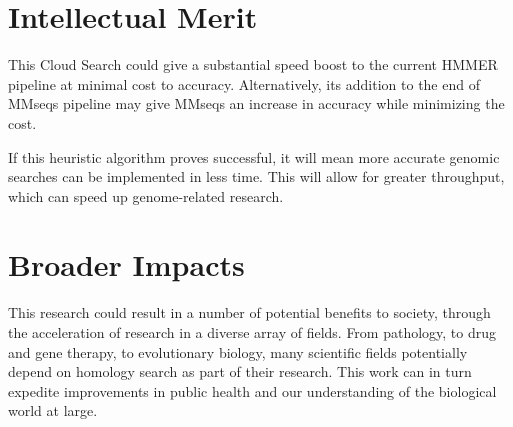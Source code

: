 \documentclass{article}
\begin{document}
	\section{Intellectual Merit}
	
	This Cloud Search could give a substantial speed boost to the current HMMER pipeline at minimal cost to accuracy.  Alternatively, its addition to the end of MMseqs pipeline may give MMseqs an increase in accuracy while minimizing the cost.  
	
	If this heuristic algorithm proves successful, it will mean more accurate genomic searches can be implemented in less time.  This will allow for greater throughput, which can speed up genome-related research.  
	
	\section{Broader Impacts}
   	
   	This research could result in a number of potential benefits to society, through the acceleration of research in a diverse array of fields.  From pathology, to drug and gene therapy, to evolutionary biology, many scientific fields potentially depend on homology search as part of their research. This work can in turn expedite improvements in public health and our understanding of the biological world at large.
	
\end{document}
